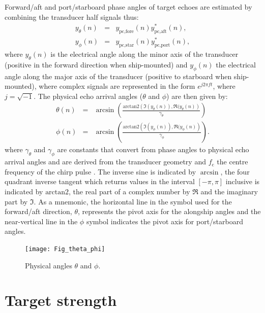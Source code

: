 \documentclass[preprint,12pt,TurnOnLineNumbers]{JASAnew}
\newcommand{\timesym}{t}
\newcommand{\freqsym}{f}
\newcommand{\samplesymt}{n}
\newcommand{\fc}{f_{\textrm{c}}}
\newcommand{\athw}{\phi}
\newcommand{\along}{\theta}
\newcommand{\atan}{\textrm{arctan2}}
\newcommand{\anglefalong}{\gamma_\along}
\newcommand{\anglefathw}{\gamma_\athw}
\begin{document}
Forward/aft and port/starboard phase angles of target echoes are estimated by combining the transducer half signals thus: 
%
\begin{eqnarray}
\label{eq:phase1}
y_\along(\samplesymt) & = & y_{\textrm{pc,fore}}(\samplesymt) y_{\textrm{pc,aft}}^*(\samplesymt), \\
y_\athw(\samplesymt) & = & y_{\textrm{pc,star}}(\samplesymt) y_{\textrm{pc,port}}^*(\samplesymt),
\end{eqnarray}
%
where $y_\along(\samplesymt)$ is the electrical angle along the minor axis of the transducer (positive in the forward direction when ship-mounted) and $y_\athw(\samplesymt)$ the electrical angle along the major axis of the transducer (positive to starboard when ship-mounted), where complex signals are represented in the form $e^{j 2\pi \freqsym \timesym}$, where $j = \sqrt{-1}$. The physical echo arrival angles ($\along$ and $\athw$) are then given by:
%
\begin{eqnarray}
\label{eq:phase2}
\along(\samplesymt) & = & \arcsin\left( \frac{\atan\left( \Im(y_\along(\samplesymt)), \Re(y_\along(\samplesymt) \right)}{\anglefalong}\right) \\
\athw(\samplesymt) & = & \arcsin\left( \frac{\atan\left( \Im(y_\athw(\samplesymt)), \Re(y_\athw(\samplesymt) \right)}{\anglefathw}\right).
\end{eqnarray}
%
where $\anglefalong$ and $\anglefathw$ are constants that convert from phase angles to physical echo arrival angles and are derived from the transducer geometry and $\fc$ the centre frequency of the chirp pulse \citep{ehrenberg1979}. The inverse sine is indicated by $\arcsin$, the four quadrant inverse tangent which returns values in the interval $[-\pi, \pi]$ inclusive is indicated by $\atan$, the real part of a complex number by $\Re$ and the imaginary part by $\Im$. As a mnemonic, the horizontal line in the symbol used for the forward/aft direction, $\along$, represents the pivot axis for the alongship angles and the near-vertical line in the $\athw$ symbol indicates the pivot axis for port/starboard angles.
%
\begin{figure}
\texttt{[image: Fig\_theta\_phi]}
\caption{\label{fi:theta_phi}Physical angles $\along$ and $\athw$.}
\end{figure}

\section{Target strength}
\end{document}

